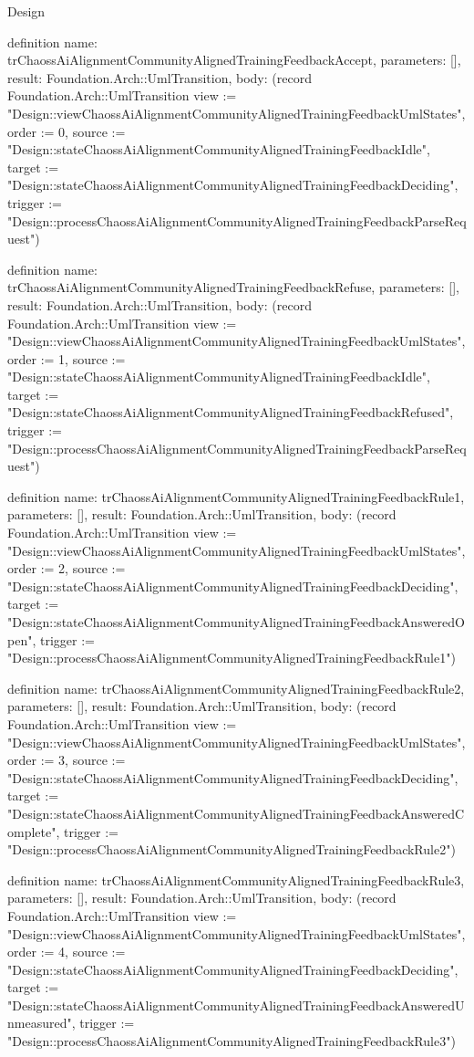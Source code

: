 \begin{lexlean}{Design}
\begin{semanticmodule}
definition{
  name: trChaossAiAlignmentCommunityAlignedTrainingFeedbackAccept,
  parameters: [],
  result: Foundation.Arch::UmlTransition,
  body: (record Foundation.Arch::UmlTransition {view := "Design::viewChaossAiAlignmentCommunityAlignedTrainingFeedbackUmlStates", order := 0, source := "Design::stateChaossAiAlignmentCommunityAlignedTrainingFeedbackIdle", target := "Design::stateChaossAiAlignmentCommunityAlignedTrainingFeedbackDeciding", trigger := "Design::processChaossAiAlignmentCommunityAlignedTrainingFeedbackParseRequest"})
}

definition{
  name: trChaossAiAlignmentCommunityAlignedTrainingFeedbackRefuse,
  parameters: [],
  result: Foundation.Arch::UmlTransition,
  body: (record Foundation.Arch::UmlTransition {view := "Design::viewChaossAiAlignmentCommunityAlignedTrainingFeedbackUmlStates", order := 1, source := "Design::stateChaossAiAlignmentCommunityAlignedTrainingFeedbackIdle", target := "Design::stateChaossAiAlignmentCommunityAlignedTrainingFeedbackRefused", trigger := "Design::processChaossAiAlignmentCommunityAlignedTrainingFeedbackParseRequest"})
}

definition{
  name: trChaossAiAlignmentCommunityAlignedTrainingFeedbackRule1,
  parameters: [],
  result: Foundation.Arch::UmlTransition,
  body: (record Foundation.Arch::UmlTransition {view := "Design::viewChaossAiAlignmentCommunityAlignedTrainingFeedbackUmlStates", order := 2, source := "Design::stateChaossAiAlignmentCommunityAlignedTrainingFeedbackDeciding", target := "Design::stateChaossAiAlignmentCommunityAlignedTrainingFeedbackAnsweredOpen", trigger := "Design::processChaossAiAlignmentCommunityAlignedTrainingFeedbackRule1"})
}

definition{
  name: trChaossAiAlignmentCommunityAlignedTrainingFeedbackRule2,
  parameters: [],
  result: Foundation.Arch::UmlTransition,
  body: (record Foundation.Arch::UmlTransition {view := "Design::viewChaossAiAlignmentCommunityAlignedTrainingFeedbackUmlStates", order := 3, source := "Design::stateChaossAiAlignmentCommunityAlignedTrainingFeedbackDeciding", target := "Design::stateChaossAiAlignmentCommunityAlignedTrainingFeedbackAnsweredComplete", trigger := "Design::processChaossAiAlignmentCommunityAlignedTrainingFeedbackRule2"})
}

definition{
  name: trChaossAiAlignmentCommunityAlignedTrainingFeedbackRule3,
  parameters: [],
  result: Foundation.Arch::UmlTransition,
  body: (record Foundation.Arch::UmlTransition {view := "Design::viewChaossAiAlignmentCommunityAlignedTrainingFeedbackUmlStates", order := 4, source := "Design::stateChaossAiAlignmentCommunityAlignedTrainingFeedbackDeciding", target := "Design::stateChaossAiAlignmentCommunityAlignedTrainingFeedbackAnsweredUnmeasured", trigger := "Design::processChaossAiAlignmentCommunityAlignedTrainingFeedbackRule3"})
}


\end{semanticmodule}
\end{lexlean}
